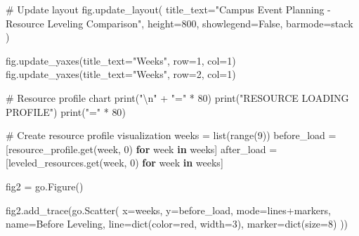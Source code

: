 \documentclass[
  letterpaper,
  DIV=11,
  numbers=noendperiod]{scrreprt}
\newenvironment{Shaded}{\begin{snugshade}}{\end{snugshade}}
\newcommand{\BuiltInTok}[1]{\textcolor[rgb]{0.00,0.23,0.31}{#1}}
\newcommand{\CharTok}[1]{\textcolor[rgb]{0.13,0.47,0.30}{#1}}
\newcommand{\CommentTok}[1]{\textcolor[rgb]{0.37,0.37,0.37}{#1}}
\newcommand{\ControlFlowTok}[1]{\textcolor[rgb]{0.00,0.23,0.31}{\textbf{#1}}}
\newcommand{\DecValTok}[1]{\textcolor[rgb]{0.68,0.00,0.00}{#1}}
\newcommand{\KeywordTok}[1]{\textcolor[rgb]{0.00,0.23,0.31}{\textbf{#1}}}
\newcommand{\NormalTok}[1]{\textcolor[rgb]{0.00,0.23,0.31}{#1}}
\newcommand{\OperatorTok}[1]{\textcolor[rgb]{0.37,0.37,0.37}{#1}}
\newcommand{\StringTok}[1]{\textcolor[rgb]{0.13,0.47,0.30}{#1}}
\newcommand{\VariableTok}[1]{\textcolor[rgb]{0.07,0.07,0.07}{#1}}
\begin{document}
\begin{Shaded}
\begin{Highlighting}[]
    \CommentTok{\# Update layout}
\NormalTok{    fig.update\_layout(}
\NormalTok{        title\_text}\OperatorTok{=}\StringTok{"Campus Event Planning {-} Resource Leveling Comparison"}\NormalTok{,}
\NormalTok{        height}\OperatorTok{=}\DecValTok{800}\NormalTok{,}
\NormalTok{        showlegend}\OperatorTok{=}\VariableTok{False}\NormalTok{,}
\NormalTok{        barmode}\OperatorTok{=}\StringTok{\textquotesingle{}stack\textquotesingle{}}
\NormalTok{    )}
    
\NormalTok{    fig.update\_yaxes(title\_text}\OperatorTok{=}\StringTok{"Weeks"}\NormalTok{, row}\OperatorTok{=}\DecValTok{1}\NormalTok{, col}\OperatorTok{=}\DecValTok{1}\NormalTok{)}
\NormalTok{    fig.update\_yaxes(title\_text}\OperatorTok{=}\StringTok{"Weeks"}\NormalTok{, row}\OperatorTok{=}\DecValTok{2}\NormalTok{, col}\OperatorTok{=}\DecValTok{1}\NormalTok{)}
    
    \CommentTok{\# Resource profile chart}
    \BuiltInTok{print}\NormalTok{(}\StringTok{"}\CharTok{\textbackslash{}n}\StringTok{"} \OperatorTok{+} \StringTok{"="} \OperatorTok{*} \DecValTok{80}\NormalTok{)}
    \BuiltInTok{print}\NormalTok{(}\StringTok{"RESOURCE LOADING PROFILE"}\NormalTok{)}
    \BuiltInTok{print}\NormalTok{(}\StringTok{"="} \OperatorTok{*} \DecValTok{80}\NormalTok{)}
    
    \CommentTok{\# Create resource profile visualization}
\NormalTok{    weeks }\OperatorTok{=} \BuiltInTok{list}\NormalTok{(}\BuiltInTok{range}\NormalTok{(}\DecValTok{9}\NormalTok{))}
\NormalTok{    before\_load }\OperatorTok{=}\NormalTok{ [resource\_profile.get(week, }\DecValTok{0}\NormalTok{) }\ControlFlowTok{for}\NormalTok{ week }\KeywordTok{in}\NormalTok{ weeks]}
\NormalTok{    after\_load }\OperatorTok{=}\NormalTok{ [leveled\_resources.get(week, }\DecValTok{0}\NormalTok{) }\ControlFlowTok{for}\NormalTok{ week }\KeywordTok{in}\NormalTok{ weeks]}
    
\NormalTok{    fig2 }\OperatorTok{=}\NormalTok{ go.Figure()}
    
\NormalTok{    fig2.add\_trace(go.Scatter(}
\NormalTok{        x}\OperatorTok{=}\NormalTok{weeks, y}\OperatorTok{=}\NormalTok{before\_load,}
\NormalTok{        mode}\OperatorTok{=}\StringTok{\textquotesingle{}lines+markers\textquotesingle{}}\NormalTok{,}
\NormalTok{        name}\OperatorTok{=}\StringTok{\textquotesingle{}Before Leveling\textquotesingle{}}\NormalTok{,}
\NormalTok{        line}\OperatorTok{=}\BuiltInTok{dict}\NormalTok{(color}\OperatorTok{=}\StringTok{\textquotesingle{}red\textquotesingle{}}\NormalTok{, width}\OperatorTok{=}\DecValTok{3}\NormalTok{),}
\NormalTok{        marker}\OperatorTok{=}\BuiltInTok{dict}\NormalTok{(size}\OperatorTok{=}\DecValTok{8}\NormalTok{)}
\NormalTok{    ))}
    

\end{Highlighting}
\end{Shaded}
\end{document}
